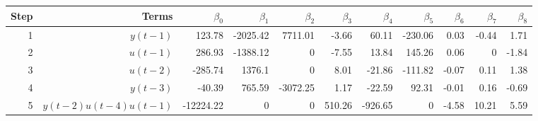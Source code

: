 \begin{tabular}{rrrrrrrrrrr}
Step & Terms & $\beta_{0}$ & $\beta_{1}$ & $\beta_{2}$ & $\beta_{3}$ & $\beta_{4}$ & $\beta_{5}$ & $\beta_{6}$ & $\beta_{7}$ & $\beta_{8}$ \\ 
\hline 
1 & $y(t-1)$ & 123.78 & -2025.42 & 7711.01 & -3.66 & 60.11 & -230.06 & 0.03 & -0.44 & 1.71 \\ 
2 & $u(t-1)$ & 286.93 & -1388.12 & 0 & -7.55 & 13.84 & 145.26 & 0.06 & 0 & -1.84 \\ 
3 & $u(t-2)$ & -285.74 & 1376.1 & 0 & 8.01 & -21.86 & -111.82 & -0.07 & 0.11 & 1.38 \\ 
4 & $y(t-3)$ & -40.39 & 765.59 & -3072.25 & 1.17 & -22.59 & 92.31 & -0.01 & 0.16 & -0.69 \\ 
5 & $y(t-2)u(t-4)u(t-1)$ & -12224.22 & 0 & 0 & 510.26 & -926.65 & 0 & -4.58 & 10.21 & 5.59 \\ 
\hline 
\end{tabular}